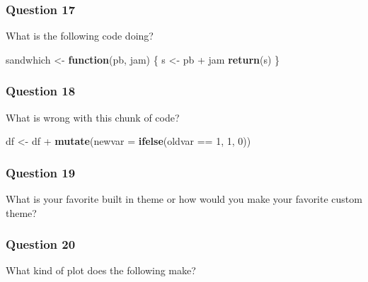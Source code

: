 \documentclass[]{tufte-book}
\newenvironment{Shaded}{}{}
\newcommand{\KeywordTok}[1]{\textcolor[rgb]{0.00,0.44,0.13}{\textbf{#1}}}
\newcommand{\DataTypeTok}[1]{\textcolor[rgb]{0.56,0.13,0.00}{#1}}
\newcommand{\DecValTok}[1]{\textcolor[rgb]{0.25,0.63,0.44}{#1}}
\newcommand{\StringTok}[1]{\textcolor[rgb]{0.25,0.44,0.63}{#1}}
\newcommand{\ControlFlowTok}[1]{\textcolor[rgb]{0.00,0.44,0.13}{\textbf{#1}}}
\newcommand{\OperatorTok}[1]{\textcolor[rgb]{0.40,0.40,0.40}{#1}}
\newcommand{\NormalTok}[1]{#1}
\theoremstyle{definition}
\theoremstyle{definition}
\theoremstyle{remark}
\begin{document}
\subsubsection*{Question 17}\label{question-17}

What is the following code doing?

\begin{Shaded}
\begin{Highlighting}[]
\NormalTok{sandwhich <-}\StringTok{ }\ControlFlowTok{function}\NormalTok{(pb, jam) \{}
\NormalTok{    s <-}\StringTok{ }\NormalTok{pb }\OperatorTok{+}\StringTok{ }\NormalTok{jam}
    \KeywordTok{return}\NormalTok{(s)}
\NormalTok{\}}
\end{Highlighting}
\end{Shaded}

\subsubsection*{Question 18}\label{question-18}

What is wrong with this chunk of code?

\begin{Shaded}
\begin{Highlighting}[]
\NormalTok{df <-}\StringTok{ }\NormalTok{df }\OperatorTok{+}\StringTok{ }\KeywordTok{mutate}\NormalTok{(}\DataTypeTok{newvar =} \KeywordTok{ifelse}\NormalTok{(oldvar }\OperatorTok{==}\StringTok{ }\DecValTok{1}\NormalTok{, }
    \DecValTok{1}\NormalTok{, }\DecValTok{0}\NormalTok{))}
\end{Highlighting}
\end{Shaded}

\subsubsection*{Question 19}\label{question-19}

What is your favorite built in theme or how would you make your favorite
custom theme?

\subsubsection*{Question 20}\label{question-20}

What kind of plot does the following make?
\end{document}
